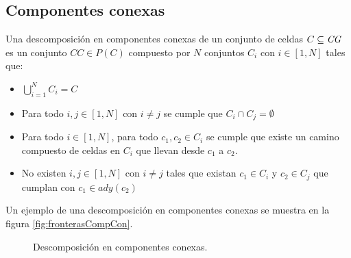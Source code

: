 \subsection{Componentes conexas} \label{subsec:CompComp}
Una descomposición en componentes conexas de un conjunto de
celdas $C \subseteq \mathit{CG}$ es un conjunto $CC\in P(C)$ compuesto por $N$ conjuntos $C_i$ con
$i\in[1,N]$ tales que:
\begin{itemize}
  \item $\bigcup_{i=1}^{N}C_i = C$ 
  \item Para todo $i,j \in [1,N]$ con $i\neq j$ se cumple que  $C_i\cap C_j = \emptyset$
  \item Para todo $i \in [1,N]$, para todo $c_1,c_2 \in C_i$ 
    se cumple que existe un camino compuesto de celdas en $C_i$ que llevan
    desde $c_1$ a $c_2$.
  \item No existen $i,j \in [1,N]$ con $i\neq j$ tales que existan $c_1 \in C_i$ y $c_2 \in C_j$ que cumplan con $c_1 \in ady(c_2)$ 
\end{itemize}

Un ejemplo de una descomposición en componentes conexas se muestra en la figura \ref{fig:fronterasCompCon}.

\begin{figure}[H]
  \centering
  \qquad

  \caption{Descomposición en componentes conexas.}\label{fig:descCompCon}
\end{figure}

